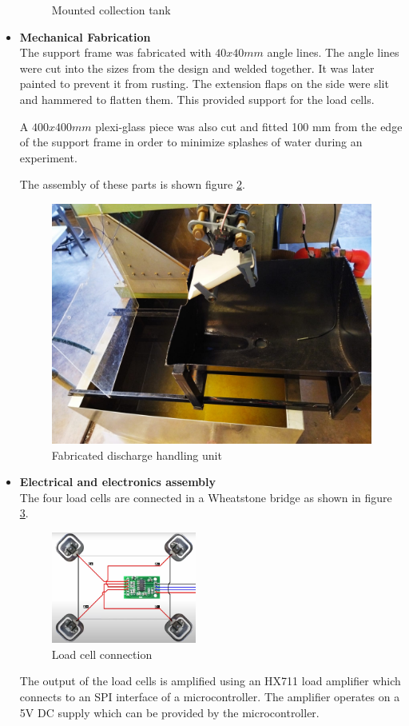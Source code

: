 \begin{itemize}
\begin{figure}[H]
    \caption{Mounted collection tank}
    \label{fig:collection tank mounted}
\end{figure}
\item \textbf{Mechanical Fabrication}\\
         The support frame was fabricated with $40x40 mm$ angle lines. The angle lines were cut into the sizes from the design and welded together. It was later painted to prevent it from rusting. The extension flaps on the side were slit and hammered to flatten them. This provided support for the load cells.
         \par
         A $400x400 mm$ plexi-glass piece was also cut and fitted 100 mm from the edge of the support frame in order to minimize splashes of water during an experiment.
         \par
         The assembly of these parts is shown figure \ref{fig:discharge handling unit}.
         \begin{figure}[H]
             \centering
             \includegraphics[width=.8\textwidth]{Figures/dsch_fabricated.jpeg}
             \caption{Fabricated discharge handling unit}
             \label{fig:discharge handling unit}
         \end{figure}
\item \textbf{Electrical and electronics assembly}\\
The four load cells are connected in a Wheatstone bridge as shown in figure \ref{fig:load_cell_connection}.
\begin{figure}[H]
    \centering
    \includegraphics[width=0.45\textwidth]{Figures/LoadCellConnection.jpg}
    \caption{Load cell connection}
    \label{fig:load_cell_connection}
\end{figure}
The output of the load cells is amplified using an HX711 load amplifier which connects to an SPI interface of a microcontroller. The amplifier operates on a 5V DC supply which can be provided by the microcontroller.

\end{itemize}
